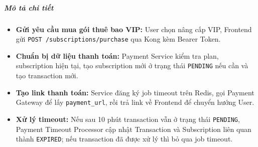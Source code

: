 \subparagraph{Mô tả chi tiết}
\begin{itemize}
\item \textbf{Gửi yêu cầu mua gói thuê bao VIP:} User chọn nâng cấp VIP, Frontend gửi \texttt{POST /subscriptions/purchase} qua Kong kèm Bearer Token.
\item \textbf{Chuẩn bị dữ liệu thanh toán:} Payment Service kiểm tra plan, subscription hiện tại, tạo subscription mới ở trạng thái \texttt{PENDING} nếu cần và tạo transaction mới.
\item \textbf{Tạo link thanh toán:} Service đăng ký job timeout trên Redis, gọi Payment Gateway để lấy \texttt{payment\_url}, rồi trả link về Frontend để chuyển hướng User.
\item \textbf{Xử lý timeout:} Nếu sau 10 phút transaction vẫn ở trạng thái \texttt{PENDING}, Payment Timeout Processor cập nhật Transaction và Subscription liên quan thành \texttt{EXPIRED}; nếu transaction đã được xử lý thì bỏ qua job timeout.
\end{itemize}
